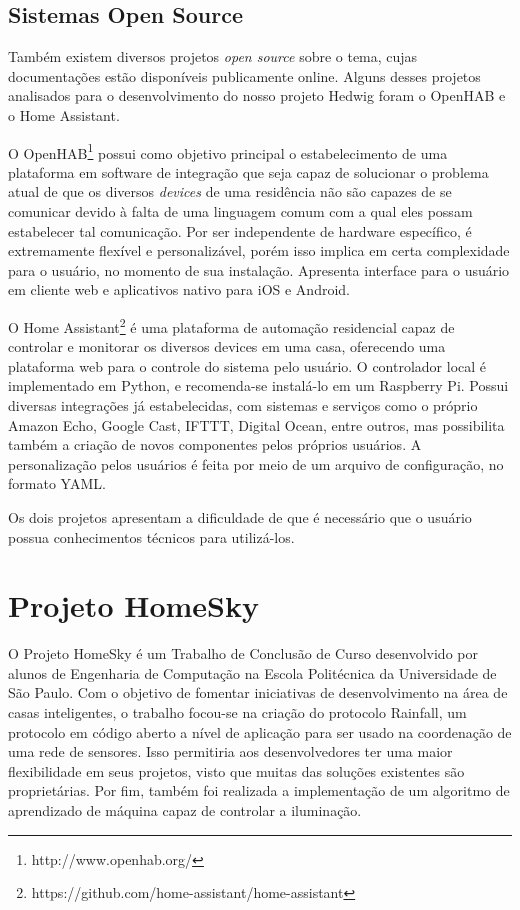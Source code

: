 \subsection{Sistemas Open Source}
Também existem diversos projetos \textit{open source} sobre o tema, cujas documentações estão disponíveis publicamente online. Alguns desses projetos analisados para o desenvolvimento do nosso projeto Hedwig foram o OpenHAB e o Home Assistant.

O OpenHAB\footnote{http://www.openhab.org/} possui como objetivo principal o estabelecimento de uma plataforma em software de integração que seja capaz de solucionar o problema atual de que os diversos \textit{devices} de uma residência não são capazes de se comunicar devido à falta de uma linguagem comum com a qual eles possam estabelecer tal comunicação. Por ser independente de hardware específico, é extremamente flexível e personalizável, porém isso implica em certa complexidade para o usuário, no momento de sua instalação. Apresenta interface para o usuário em cliente web e aplicativos nativo para iOS e Android.

O Home Assistant\footnote{https://github.com/home-assistant/home-assistant} é uma plataforma de automação residencial capaz de controlar e monitorar os diversos devices em uma casa, oferecendo uma plataforma web para o controle do sistema pelo usuário. O controlador local é implementado em Python, e recomenda-se instalá-lo em um Raspberry Pi. Possui diversas integrações já estabelecidas, com sistemas e serviços como o próprio Amazon Echo, Google Cast, IFTTT, Digital Ocean, entre outros, mas possibilita também a criação de novos componentes pelos próprios usuários. A personalização pelos usuários é feita por meio de um arquivo de configuração, no formato YAML.

Os dois projetos apresentam a dificuldade de que é necessário que o usuário possua conhecimentos técnicos para utilizá-los.

\section{Projeto HomeSky}

O Projeto HomeSky \cite{homeSky} é um Trabalho de Conclusão de Curso desenvolvido por alunos de Engenharia de Computação na Escola Politécnica da Universidade de São Paulo. Com o objetivo de fomentar iniciativas de desenvolvimento na área de casas inteligentes, o trabalho focou-se na criação do protocolo Rainfall, um protocolo em código aberto a nível de aplicação para ser usado na coordenação de uma rede de sensores. Isso permitiria aos desenvolvedores ter uma maior flexibilidade em seus projetos, visto que muitas das soluções existentes são proprietárias. Por fim, também foi realizada a implementação de um algoritmo de aprendizado de máquina capaz de controlar a iluminação.

